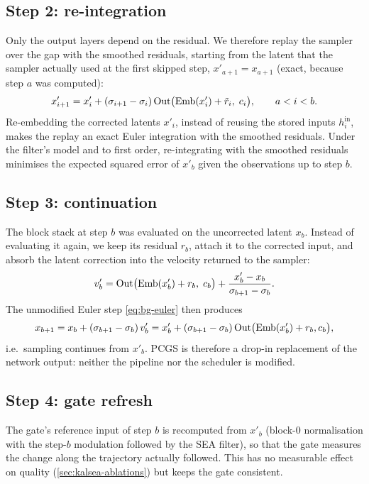 \subsection{Step 2: re-integration}
Only the output layers depend on the residual. We therefore replay the sampler over the gap with the smoothed residuals, starting from the latent that the sampler actually used at the first skipped step, $x'_{a+1} = x_{a+1}$ (exact, because step $a$ was computed):
\begin{equation}\label{eq:kalsea-reint}
  x'_{i+1} = x'_i + (\sigma_{i+1}-\sigma_i)\,\mathrm{Out}\big(\mathrm{Emb}(x'_i) + \tilde r_i,\; c_i\big), \qquad a<i<b .
\end{equation}
Re-embedding the corrected latents $x'_i$, instead of reusing the stored inputs $h^{\mathrm{in}}_i$, makes the replay an exact Euler integration with the smoothed residuals. Under the filter's model and to first order, re-integrating with the smoothed residuals minimises the expected squared error of $x'_b$ given the observations up to step $b$.

\subsection{Step 3: continuation}
The block stack at step $b$ was evaluated on the uncorrected latent $x_b$. Instead of evaluating it again, we keep its residual $r_b$, attach it to the corrected input, and absorb the latent correction into the velocity returned to the sampler:
\begin{equation}\label{eq:kalsea-cont}
  v'_b = \mathrm{Out}\big(\mathrm{Emb}(x'_b) + r_b,\; c_b\big) + \frac{x'_b - x_b}{\sigma_{b+1}-\sigma_b} .
\end{equation}
The unmodified Euler step \cref{eq:bg-euler} then produces
\begin{equation}
  x_{b+1} = x_b + (\sigma_{b+1}-\sigma_b)\,v'_b = x'_b + (\sigma_{b+1}-\sigma_b)\,\mathrm{Out}\big(\mathrm{Emb}(x'_b)+r_b, c_b\big),
\end{equation}
i.e.\ sampling continues from $x'_b$. PCGS is therefore a drop-in replacement of the network output: neither the pipeline nor the scheduler is modified.

\subsection{Step 4: gate refresh}
The gate's reference input of step $b$ is recomputed from $x'_b$ (block-0 normalisation with the step-$b$ modulation followed by the SEA filter), so that the gate measures the change along the trajectory actually followed. This has no measurable effect on quality (\cref{sec:kalsea-ablations}) but keeps the gate consistent.


